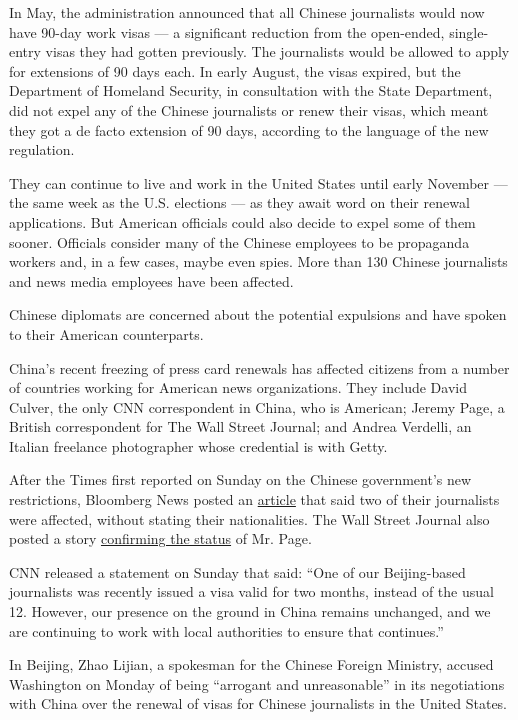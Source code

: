 In May, the administration announced that all Chinese journalists would
now have 90-day work visas --- a significant reduction from the
open-ended, single-entry visas they had gotten previously. The
journalists would be allowed to apply for extensions of 90 days each. In
early August, the visas expired, but the Department of Homeland
Security, in consultation with the State Department, did not expel any
of the Chinese journalists or renew their visas, which meant they got a
de facto extension of 90 days, according to the language of the new
regulation.

They can continue to live and work in the United States until early
November --- the same week as the U.S. elections --- as they await word
on their renewal applications. But American officials could also decide
to expel some of them sooner. Officials consider many of the Chinese
employees to be propaganda workers and, in a few cases, maybe even
spies. More than 130 Chinese journalists and news media employees have
been affected.

Chinese diplomats are concerned about the potential expulsions and have
spoken to their American counterparts.

China's recent freezing of press card renewals has affected citizens
from a number of countries working for American news organizations. They
include David Culver, the only CNN correspondent in China, who is
American; Jeremy Page, a British correspondent for The Wall Street
Journal; and Andrea Verdelli, an Italian freelance photographer whose
credential is with Getty.

After the Times first reported on Sunday on the Chinese government's new
restrictions, Bloomberg News posted an
\href{https://www.bloomberg.com/news/articles/2020-09-07/china-delays-credentials-for-journalists-with-u-s-media-outlets}{article}
that said two of their journalists were affected, without stating their
nationalities. The Wall Street Journal also posted a story
\href{https://www.wsj.com/articles/china-delays-approving-press-credentials-for-foreign-reporters-in-media-standoff-11599401714}{confirming
the status} of Mr. Page.

CNN released a statement on Sunday that said: ``One of our Beijing-based
journalists was recently issued a visa valid for two months, instead of
the usual 12. However, our presence on the ground in China remains
unchanged, and we are continuing to work with local authorities to
ensure that continues.''

In Beijing, Zhao Lijian, a spokesman for the Chinese Foreign Ministry,
accused Washington on Monday of being ``arrogant and unreasonable'' in
its negotiations with China over the renewal of visas for Chinese
journalists in the United States.

